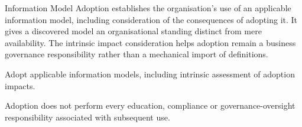 Information Model Adoption establishes the organisation's use of an applicable information model, including consideration of the consequences of adopting it. It gives a discovered model an organisational standing distinct from mere availability. The intrinsic impact consideration helps adoption remain a business governance responsibility rather than a mechanical import of definitions.



Adopt applicable information models, including intrinsic assessment of adoption impacts.



Adoption does not perform every education, compliance or governance-oversight responsibility associated with subsequent use.



